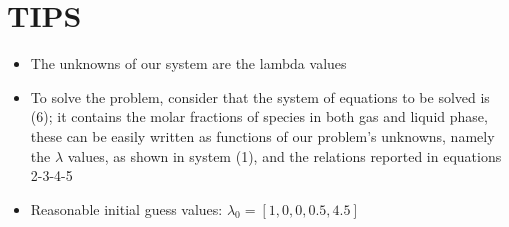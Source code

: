 \documentclass[oneside]{article}
\begin{document}
\section*{\color{bluepoli} TIPS}
\begin{itemize}
   \item The unknowns of our system are the lambda values
   \item To solve the problem, consider that the system of equations to be solved is (6); it contains the molar fractions of species in both gas and liquid phase, these can be easily written as functions of our problem's unknowns, namely the $\lambda$ values, as shown in system (1), and the relations reported in equations 2-3-4-5
   \item Reasonable initial guess values: $\lambda_{0}=[1, 0, 0, 0.5, 4.5]$
\end{itemize}
\end{document}
